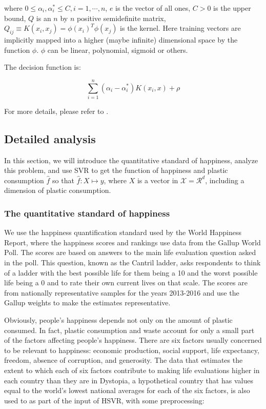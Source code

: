 \documentclass{mcmthesis}
\begin{document}
where $0 \le \alpha_i, \alpha_i^* \le C, i = 1, \cdots, n$, $e$ is the vector of all ones, $C > 0$ is the upper bound, $Q$ is an $n$ by $n$ positive semidefinite matrix, $Q_{ij} \equiv K(x_i, x_j) = {\phi(x_i)}^T\phi(x_j)$ is the kernel. Here training vectors are implicitly mapped into a higher (maybe infinite) dimensional space by the function $\phi$. $\phi$ can be linear, polynomial, sigmoid or others.

The decision function is:

\begin{equation}
\sum_{i = 1}^{n}(\alpha_i - \alpha_i^*)K(x_i,x) + \rho
\label{decision}
\end{equation}

For more details, please refer to \cite{Smola}.

\subsection{Detailed analysis}

In this section, we will introduce the quantitative standard of happiness, analyze this problem, and use SVR to get the function of happiness and plastic consumption $\hat{f}$ so that $\hat{f}: X \mapsto y$, where $X$ is a vector in $\mathcal{X} = \mathcal{R}^d$, including a dimension of plastic consumption.

\subsubsection{The quantitative standard of happiness}

We use the happiness quantification standard used by the World Happiness Report\cite{World}, where the happiness scores and rankings use data from the Gallup World Poll. The scores are based on answers to the main life evaluation question asked in the poll. This question, known as the Cantril ladder, asks respondents to think of a ladder with the best possible life for them being a 10 and the worst possible life being a 0 and to rate their own current lives on that scale. The scores are from nationally representative samples for the years 2013-2016 and use the Gallup weights to make the estimates representative. 

Obviously, people's happiness depends not only on the amount of plastic consumed. In fact, plastic consumption and waste account for only a small part of the factors affecting people's happiness. There are six factors usually concerned to be relevant to happiness: economic production, social support, life expectancy, freedom, absence of corruption, and generosity. The data that estimates the extent to which each of six factors contribute to making life evaluations higher in each country than they are in Dystopia, a hypothetical country that has values equal to the world’s lowest national averages for each of the six factors, is also used to as part of the input of HSVR, with some preprocessing:
\end{document}
